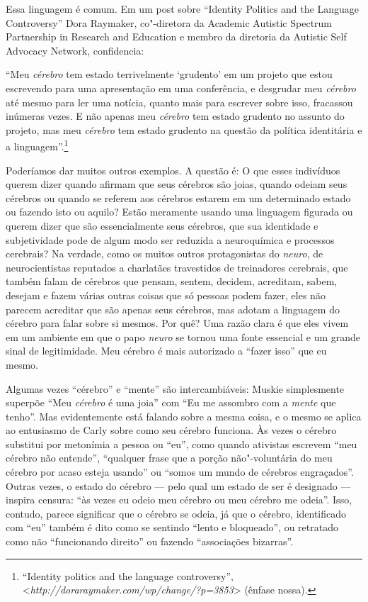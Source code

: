 Essa linguagem é comum. Em um post sobre ``Identity Politics and the
Language Controversy'' Dora Raymaker, co"-diretora da Academic Autistic
Spectrum Partnership in Research and Education e membro da diretoria da
Autistic Self Advocacy Network, confidencia:

``Meu \emph{cérebro} tem estado terrivelmente `grudento' em um projeto
que estou escrevendo para uma apresentação em uma conferência, e
desgrudar meu \emph{cérebro} até mesmo para ler uma notícia, quanto mais
para escrever sobre isso, fracassou inúmeras vezes. E não apenas meu
\emph{cérebro} tem estado grudento no assunto do projeto, mas meu
\emph{cérebro} tem estado grudento na questão da política identitária e
a linguagem''.\footnote[27]{``Identity politics and the language controversy'',
\textless{}\emph{http://doraraymaker.com/wp/change/?p=3853}\textgreater{} (ênfase nossa).}

Poderíamos dar muitos outros exemplos. A questão é: O que esses
indivíduos querem dizer quando afirmam que seus cérebros são joias,
quando odeiam seus cérebros ou quando se referem aos cérebros estarem em
um determinado estado ou fazendo isto ou aquilo? Estão meramente usando
uma linguagem figurada ou querem dizer que são essencialmente seus
cérebros, que sua identidade e subjetividade pode de algum modo ser
reduzida a neuroquímica e processos cerebrais? Na verdade, como os
muitos outros protagonistas do \emph{neuro}, de neurocientistas
reputados a charlatães travestidos de treinadores cerebrais, que também
falam de cérebros que pensam, sentem, decidem, acreditam, sabem, desejam
e fazem várias outras coisas que só pessoas podem fazer, eles não
parecem acreditar que são apenas seus cérebros, mas adotam a linguagem
do cérebro para falar sobre si mesmos. Por quê? Uma razão clara é que
eles vivem em um ambiente em que o papo \emph{neuro} se tornou uma fonte
essencial e um grande sinal de legitimidade. Meu cérebro é mais
autorizado a ``fazer isso'' que eu mesmo.

Algumas vezes ``cérebro'' e ``mente'' são intercambiáveis: Muskie
simplesmente superpõe ``Meu \emph{cérebro} é uma joia'' com ``Eu me
assombro com a \emph{mente} que tenho''. Mas evidentemente está falando
sobre a mesma coisa, e o mesmo se aplica ao entusiasmo de Carly sobre
como seu cérebro funciona. Às vezes o cérebro substitui por metonímia a
pessoa ou ``eu'', como quando ativistas escrevem ``meu cérebro não
entende'', ``qualquer frase que a porção não"-voluntária do meu cérebro
por acaso esteja usando'' ou ``somos um mundo de cérebros engraçados''.
Outras vezes, o estado do cérebro --- pelo qual um estado de ser é
designado --- inspira censura: ``às vezes eu odeio meu cérebro ou meu
cérebro me odeia''. Isso, contudo, parece significar que o cérebro se
odeia, já que o cérebro, identificado com ``eu'' também é dito como se
sentindo ``lento e bloqueado'', ou retratado como não ``funcionando
direito'' ou fazendo ``associações bizarras''.

